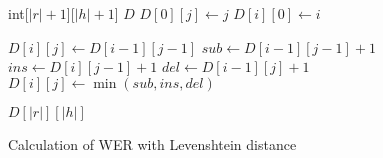 \documentclass{article}
\begin{document}
\begin{preview}
    \begin{algorithm}[H]
        \begin{algorithmic}
                \State int[$|r|+1$][$|h|+1$] $D$ 
                            \State $D[0][j] \gets j$
                            \State $D[i][0] \gets i$
                        \EndIf
                    \EndFor
                \EndFor

                \State
                 
                            \State $D[i][j] \gets D[i-1][j-1]$
                        \Else
                            \State $sub \gets D[i-1][j-1] + 1$
                            \State $ins \gets D[i][j-1] + 1$
                            \State $del \gets D[i-1][j] + 1$
                            \State $D[i][j] \gets \min(sub, ins, del)$
                        \EndIf
                    \EndFor
                \EndFor

                \State 
                \State \Return $D[|r|][|h|]$
            \EndFunction
        \end{algorithmic}
    \caption{Calculation of WER with Levenshtein distance}
    \label{alg:seq1}
    \end{algorithm}
\end{preview}
\end{document}
